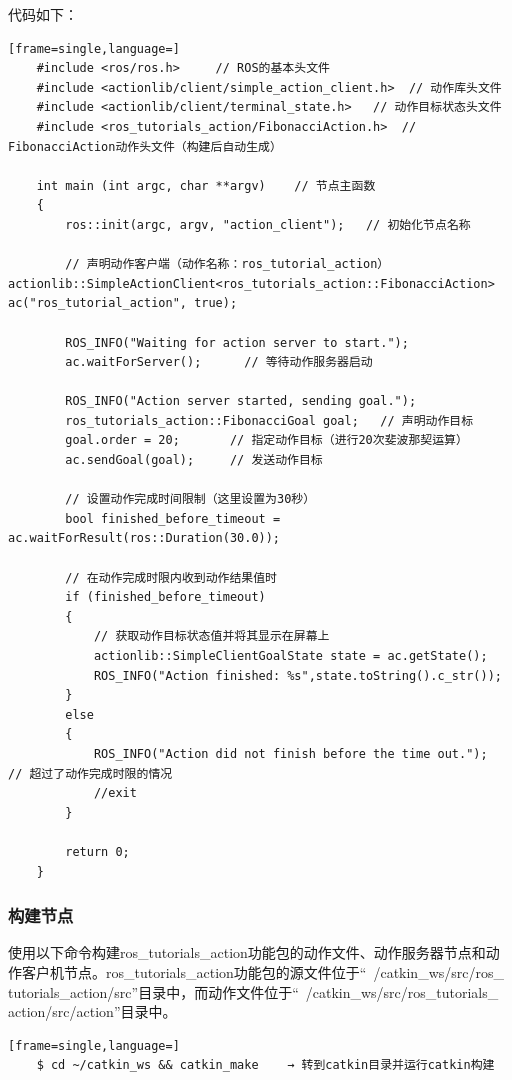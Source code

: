 \documentclass[geye,green,kindle,cn]{elegantnote}
\begin{document}
代码如下：
\begin{lstlisting}[frame=single,language=]
    #include <ros/ros.h>     // ROS的基本头文件 
    #include <actionlib/client/simple_action_client.h>  // 动作库头文件 
    #include <actionlib/client/terminal_state.h>   // 动作目标状态头文件 
    #include <ros_tutorials_action/FibonacciAction.h>  // FibonacciAction动作头文件（构建后自动生成） 
    
    int main (int argc, char **argv)    // 节点主函数 
    {  
        ros::init(argc, argv, "action_client");   // 初始化节点名称  
        
        // 声明动作客户端（动作名称：ros_tutorial_action）  actionlib::SimpleActionClient<ros_tutorials_action::FibonacciAction> ac("ros_tutorial_action", true);  

        ROS_INFO("Waiting for action server to start.");  
        ac.waitForServer();      // 等待动作服务器启动  
        
        ROS_INFO("Action server started, sending goal.");  
        ros_tutorials_action::FibonacciGoal goal;   // 声明动作目标  
        goal.order = 20;       // 指定动作目标（进行20次斐波那契运算）  
        ac.sendGoal(goal);     // 发送动作目标  
        
        // 设置动作完成时间限制（这里设置为30秒）  
        bool finished_before_timeout = ac.waitForResult(ros::Duration(30.0));  
        
        // 在动作完成时限内收到动作结果值时  
        if (finished_before_timeout)  
        {    
            // 获取动作目标状态值并将其显示在屏幕上    
            actionlib::SimpleClientGoalState state = ac.getState();    
            ROS_INFO("Action finished: %s",state.toString().c_str());  
        }  
        else
        {
            ROS_INFO("Action did not finish before the time out.");   // 超过了动作完成时限的情况
            //exit
        }
        
        return 0; 
    } 
\end{lstlisting}
\subsubsection{构建节点}
使用以下命令构建ros_tutorials_action功能包的动作文件、动作服务器节点和动 作客户机节点。ros_tutorials_action功能包的源文件位于“~/catkin_ws/src/ros_ tutorials_action/src”目录中，而动作文件位于“~/catkin_ws/src/ros_tutorials_ action/src/action”目录中。 
\begin{lstlisting}[frame=single,language=]
    $ cd ~/catkin_ws && catkin_make    → 转到catkin目录并运行catkin构建
\end{lstlisting}
\end{document}
